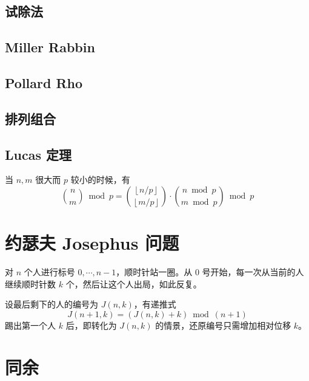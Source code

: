 \documentclass{probook}
\begin{document}
\begin{multicols}{2}
\subsection{试除法}



\subsection{Miller Rabbin}



\subsection{Pollard Rho}



\subsection{排列组合}

\subsection{Lucas 定理}

当 $n,m$ 很大而 $p$ 较小的时候，有
\[  
\binom{n}{m}\bmod p = \binom{\left\lfloor n/p \right\rfloor}{\left\lfloor m/p\right\rfloor}\cdot\binom{n\bmod p}{m\bmod p}\bmod p 
\]



\section{约瑟夫 Josephus 问题}

对 $n$ 个人进行标号 $0,\cdots,n-1$，顺时针站一圈。从 $0$ 号开始，每一次从当前的人继续顺时针数 $k$ 个，然后让这个人出局，如此反复。

设最后剩下的人的编号为 $J(n,k)$，有递推式
\[J(n+1,k) = (J(n,k)+k) \bmod (n+1)\]
踢出第一个人 $k$ 后，即转化为 $J(n,k)$ 的情景，还原编号只需增加相对位移 $k$。



\section{同余}


\end{multicols}
\end{document}
